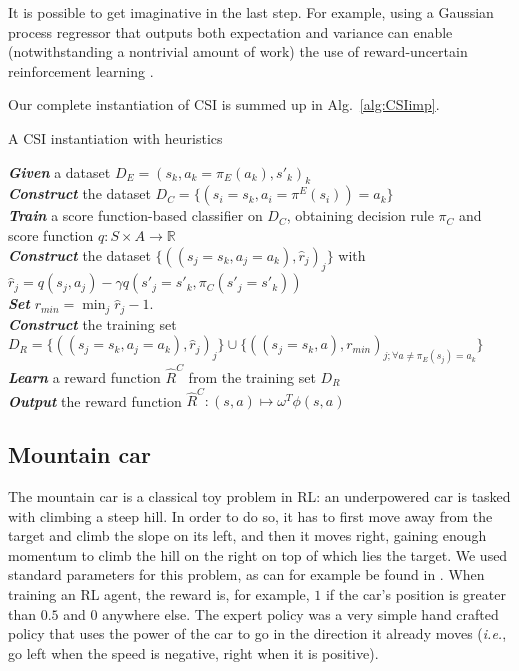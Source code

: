 \documentclass{llncs}
\begin{document}
It is possible to get imaginative in the last step. For example, using a Gaussian process regressor \cite{rasmussen2006gaussian} that outputs both expectation and variance can enable (notwithstanding a nontrivial amount of work) the use of reward-uncertain reinforcement learning \cite{regan2011robust}. 

Our complete instantiation of CSI is summed up in Alg.~\ref{alg:CSIimp}.
\begin{algorithm}%
  \caption{A CSI instantiation with heuristics}
  \label{alg:CSIimp}
  \emph{\textbf{Given}} a dataset  $D_E = (s_k,a_k=\pi_E(a_k),s'_k)_k$\;\\
  \emph{\textbf{Construct}} the dataset $D_C=\{(s_i=s_k,a_i=\pi^E(s_i))=a_k\}$ \;\\
  \emph{\textbf{Train}} a score function-based classifier on $D_C$, obtaining decision rule $\pi_C$ and score function $q:S\times A \rightarrow \mathbb R$ \;\\
\emph{\textbf{Construct}} the dataset $\{((s_{j}=s_k,a_{j}=a_k),\hat r_j)_j\}$ with $\hat r_j = q(s_j,a_j) - \gamma q(s'_j=s'_k,\pi_C(s'_j=s'_k))$\;\\
\emph{\textbf{Set}} $r_{min} = \min_j\hat r_j - 1.$\;\\
\emph{\textbf{Construct}} the training set  $D_R = \{((s_{j}=s_k,a_{j}=a_k),\hat r_j)_j\}\cup\{((s_j=s_k,a),r_{min})_{j;\forall a\neq \pi_E(s_j) = a_k}\}$ \;\\
\emph{\textbf{Learn}} a reward function $\hat R^C$ from the training set $D_R$\;\\
\emph{\textbf{Output}} the reward function $\hat R^{C}: (s,a) \mapsto \omega^T \phi(s,a)$ \;
\end{algorithm}
\subsection{Mountain car}
\label{subsec:mountaincar}
The mountain car is a classical toy problem in RL: an underpowered car is tasked with climbing a steep hill. In order to do so, it has to first move away from the target and climb the slope on its left, and then it moves right, gaining enough momentum to climb the hill on the right on top of which lies the target. We used standard parameters for this problem, as can for example be found in \cite{sutton1998reinforcement}. When training an RL agent, the reward is, for example, $1$ if the car's position is greater than $0.5$ and $0$ anywhere else. The expert policy was a very simple hand crafted policy that uses the power of the car to go in the direction it already moves ({\it i.e.}, go left when the speed is negative, right when it is positive).\\
\end{document}
